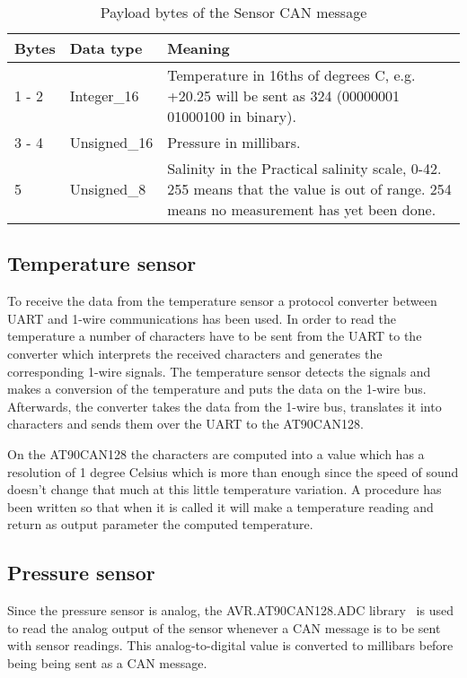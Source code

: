\begin{table*}
\centering
    \caption{Payload bytes of the Sensor CAN message}
    \begin{tabular}{|l|l|p{11cm}|} \hline
    \label{table:SensorMessage}
    	\textbf{Bytes} & \textbf{Data type} & \textbf{Meaning} \\ \hline
        1 - 2 & Integer\_16 & Temperature in 16ths of degrees C, e.g. +20.25 will be sent as 324 \newline 
        (00000001 01000100 in binary). \\ \hline
        3 - 4 & Unsigned\_16 & Pressure in millibars. \\ \hline
        5  & Unsigned\_8 & Salinity in the Practical salinity scale, 0-42. 255 means that the value is out of range. 254 means no measurement has yet been done. \\ \hline
    \end{tabular}
\end{table*}

\subsection{Temperature sensor}
To receive the data from the temperature sensor a protocol converter between UART and 1-wire communications has been used. In order to read the temperature a number of characters have to be sent from the UART to the converter which interprets the received characters and generates the corresponding 1-wire signals. The temperature sensor detects the signals and makes a conversion of the temperature and puts the data on the 1-wire bus. Afterwards, the converter takes the data from the 1-wire bus, translates it into characters and sends them over the UART to the AT90CAN128. 

On the AT90CAN128 the characters are computed into a value which has a resolution of 1 degree Celsius which is more than enough since the speed of sound doesn't change that much at this little temperature variation. A procedure has been written so that when it is called it will make a temperature reading and return as output parameter the computed temperature.

\subsection{Pressure sensor}
Since the pressure sensor is analog, the AVR.AT90CAN128.ADC library~\cite{web:naiad_git} is used to read the analog output of the sensor whenever a CAN message is to be sent with sensor readings. This analog-to-digital value is converted to millibars before being being sent as a CAN message. 



